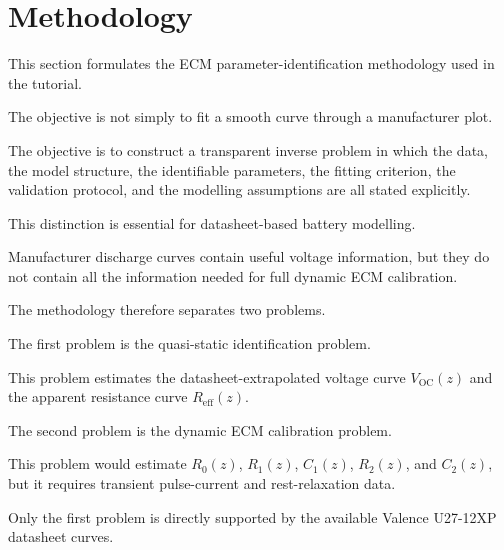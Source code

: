 \documentclass[a4paper,12pt]{article}
\begin{document}
\clearpage
\newpage
\section{Methodology}
\label{sec:methodology}

This section formulates the ECM parameter-identification methodology used in the tutorial.

The objective is not simply to fit a smooth curve through a manufacturer plot.

The objective is to construct a transparent inverse problem in which the data, the model structure, the identifiable parameters, the fitting criterion, the validation protocol, and the modelling assumptions are all stated explicitly.

This distinction is essential for datasheet-based battery modelling.

Manufacturer discharge curves contain useful voltage information, but they do not contain all the information needed for full dynamic ECM calibration.

The methodology therefore separates two problems.

The first problem is the quasi-static identification problem.

This problem estimates the datasheet-extrapolated voltage curve \(V_{\mathrm{OC}}(z)\) and the apparent resistance curve \(R_{\mathrm{eff}}(z)\).

The second problem is the dynamic ECM calibration problem.

This problem would estimate \(R_0(z)\), \(R_1(z)\), \(C_1(z)\), \(R_2(z)\), and \(C_2(z)\), but it requires transient pulse-current and rest-relaxation data.

Only the first problem is directly supported by the available Valence U27-12XP datasheet curves.

\begin{center}
\end{center}
\end{document}
